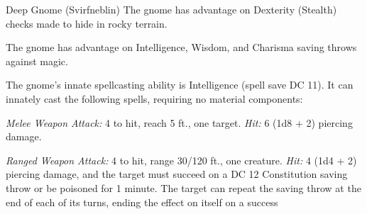 \documentclass[10pt,a4paper,twoside,bg=print,twocolumn,openany,nodeprecatedcode]{dndbook}
\begin{document}
\begin{DndMonster}[float=t]{Deep Gnome (Svirfneblin)}
\DndMonsterBasics[
armor-class = {15 (\textit{chain shirt})},
hit-points = {\DndDice{3d6 + 6}},
speed = {20 ft.}
]
\DndMonsterAbilityScores[
 str = 15,
 dex = 14,
 con = 14,
 int = 12,
 wis = 10,
 cha = 9
]
\DndMonsterDetails[
skills = {Investigation +3, Perception +2, Stealth +4},
senses = {darkvision 120 ft., passive perception 12},
languages = {Gnomish, Terran, Undercommon},
challenge = 1/2,
]
The gnome has advantage on Dexterity (Stealth) checks made to hide in rocky terrain.

The gnome has advantage on Intelligence, Wisdom, and Charisma saving throws against magic.

The gnome's innate spellcasting ability is Intelligence (spell save DC 11). It can innately cast the following spells, requiring no material components:
\begin{DndMonsterSpells}
\end{DndMonsterSpells}
\textsl{Melee Weapon Attack:} 4 to hit, reach 5 ft., one target. \textsl{Hit:} 6 (1d8 + 2) piercing damage.

\textsl{Ranged Weapon Attack:} 4 to hit, range 30/120 ft., one creature. \textsl{Hit:} 4 (1d4 + 2) piercing damage, and the target must succeed on a DC 12 Constitution saving throw or be poisoned for 1 minute. The target can repeat the saving throw at the end of each of its turns, ending the effect on itself on a success

\end{DndMonster}
\end{document}
